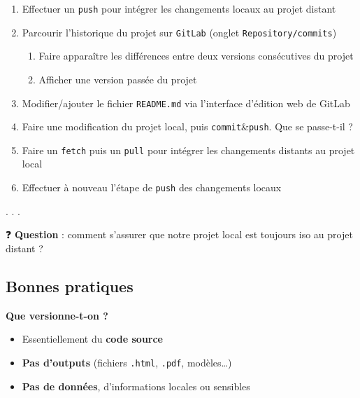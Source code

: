 \documentclass[
  letterpaper,
  DIV=11,
  numbers=noendperiod]{scrartcl}
\providecommand{\tightlist}{%
  \setlength{\itemsep}{0pt}\setlength{\parskip}{0pt}}\usepackage{longtable,booktabs,array}
\begin{document}
\begin{tcolorbox}[enhanced jigsaw, colframe=quarto-callout-tip-color-frame, rightrule=.15mm, breakable, colbacktitle=quarto-callout-tip-color!10!white, coltitle=black, toptitle=1mm, title={Interactions avec le dépôt distant}, titlerule=0mm, leftrule=.75mm, colback=white, bottomrule=.15mm, bottomtitle=1mm, toprule=.15mm, opacitybacktitle=0.6, arc=.35mm, left=2mm, opacityback=0]

\begin{enumerate}
\def\labelenumi{\arabic{enumi}.}
\tightlist
\item
  Effectuer un \texttt{push} pour intégrer les changements locaux au
  projet distant
\item
  Parcourir l'historique du projet sur \texttt{GitLab} (onglet
  \texttt{Repository/commits})

  \begin{enumerate}
  \def\labelenumii{\alph{enumii}.}
  \tightlist
  \item
    Faire apparaître les différences entre deux versions consécutives du
    projet
  \item
    Afficher une version passée du projet
  \end{enumerate}
\item
  Modifier/ajouter le fichier \texttt{README.md} via l'interface
  d'édition web de GitLab
\item
  Faire une modification du projet local, puis
  \texttt{commit}\&\texttt{push}. Que se passe-t-il ?
\item
  Faire un \texttt{fetch} puis un \texttt{pull} pour intégrer les
  changements distants au projet local
\item
  Effectuer à nouveau l'étape de \texttt{push} des changements locaux
\end{enumerate}

\end{tcolorbox}

. . .

❓ \textbf{Question} : comment s'assurer que notre projet local est
toujours iso au projet distant ?

\hypertarget{bonnes-pratiques}{%
\subsection{Bonnes pratiques}\label{bonnes-pratiques}}

\textbf{Que versionne-t-on ?}

\begin{itemize}
\tightlist
\item
  Essentiellement du {\textbf{code source}}
\item
  {\textbf{Pas d'outputs}} (fichiers \texttt{.html}, \texttt{.pdf},
  modèles\ldots)
\item
  {\textbf{Pas de données}}, d'informations locales ou sensibles
\end{itemize}
\end{document}
